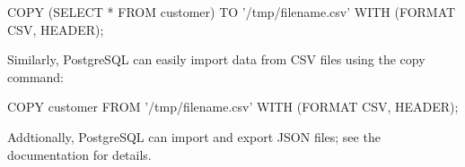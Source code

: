 \begin{samepage}
\begin{sqlcode}
COPY (SELECT * FROM customer) 
  TO '/tmp/filename.csv' 
  WITH (FORMAT CSV, HEADER);
\end{sqlcode}
\end{samepage}

Similarly, PostgreSQL can easily import data from CSV files using the copy command:

\begin{samepage}
\begin{sqlcode}
COPY customer 
  FROM '/tmp/filename.csv' 
  WITH (FORMAT CSV, HEADER);
\end{sqlcode}
\end{samepage}

Addtionally, PostgreSQL can import and export JSON files; see the documentation for details.

